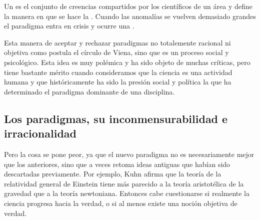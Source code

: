 


\begin{remember}
	\label{rem:paradigma}
	Un  es el conjunto de creencias compartidos por los
	científicos de un área y define la manera en que se hace la
	.
	Cuando las anomalías se vuelven demasiado grandes el paradigma entra
	en crisis y ocurre una .
\end{remember}

Esta manera de aceptar y rechazar paradigmas no totalemente racional ni objetiva como postula el círculo de Viena, sino que es un proceso social y psicológico.
Esta idea es muy polémica y ha sido objeto de muchas críticas, pero tiene bastante mérito cuando consideramos que la ciencia es una actividad humana y que históricamente ha sido la presión social y política la que ha determinado el paradigma dominante de una disciplina.

\subsection*{Los paradigmas, su inconmensurabilidad e irracionalidad}
Pero la cosa se pone peor, ya que el nuevo paradigma no es necesariamente mejor que los anteriores, sino que a veces retoma ideas antiguas que habían sido descartadas previamente.
Por ejemplo, Kuhn afirma que la teoría de la relatividad general de Einstein tiene más parecido a la teoría aristotélica de la gravedad que a la teoría newtoniana.
Entonces cabe cuestionarse si realmente la ciencia progresa hacia la verdad, o si al menos existe una noción objetiva de verdad.


